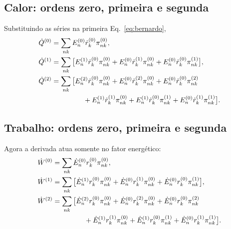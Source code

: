 \subsection{Calor: ordens zero, primeira e segunda}
Substituindo as séries na primeira Eq.~\eqref{eq:bernardo},
\begin{align}
 \dot Q^{(0)}
 &=\sum_{nk}E_n^{(0)}\dot r_k^{(0)}\pi_{nk}^{(0)},\label{eq:Q0}\\
 \dot Q^{(1)}
 &=\sum_{nk}\big[
 E_n^{(1)}\dot r_k^{(0)}\pi_{nk}^{(0)}
 +E_n^{(0)}\dot r_k^{(1)}\pi_{nk}^{(0)}
 +E_n^{(0)}\dot r_k^{(0)}\pi_{nk}^{(1)}\big],\label{eq:Q1}\\
 \dot Q^{(2)}
 &=\sum_{nk}\big[
 E_n^{(2)}\dot r_k^{(0)}\pi_{nk}^{(0)}
 +E_n^{(0)}\dot r_k^{(2)}\pi_{nk}^{(0)}
 +E_n^{(0)}\dot r_k^{(0)}\pi_{nk}^{(2)}\nonumber\\
 &\hspace{16mm}
 +E_n^{(1)}\dot r_k^{(1)}\pi_{nk}^{(0)}
 +E_n^{(1)}\dot r_k^{(0)}\pi_{nk}^{(1)}
 +E_n^{(0)}\dot r_k^{(1)}\pi_{nk}^{(1)}\big].
 \label{eq:Q2}
\end{align}

\subsection{Trabalho: ordens zero, primeira e segunda}
Agora a derivada atua somente no fator energético:
\begin{align}
 \dot W^{(0)}
 &=\sum_{nk}\dot E_n^{(0)}r_k^{(0)}\pi_{nk}^{(0)},\label{eq:W0}\\
 \dot W^{(1)}
 &=\sum_{nk}\big[
 \dot E_n^{(1)}r_k^{(0)}\pi_{nk}^{(0)}
 +\dot E_n^{(0)}r_k^{(1)}\pi_{nk}^{(0)}
 +\dot E_n^{(0)}r_k^{(0)}\pi_{nk}^{(1)}\big],\label{eq:W1}\\
 \dot W^{(2)}
 &=\sum_{nk}\big[
 \dot E_n^{(2)}r_k^{(0)}\pi_{nk}^{(0)}
 +\dot E_n^{(0)}r_k^{(2)}\pi_{nk}^{(0)}
 +\dot E_n^{(0)}r_k^{(0)}\pi_{nk}^{(2)}\nonumber\\
 &\hspace{16mm}
 +\dot E_n^{(1)}r_k^{(1)}\pi_{nk}^{(0)}
 +\dot E_n^{(1)}r_k^{(0)}\pi_{nk}^{(1)}
 +\dot E_n^{(0)}r_k^{(1)}\pi_{nk}^{(1)}\big].
 \label{eq:W2}
\end{align}

